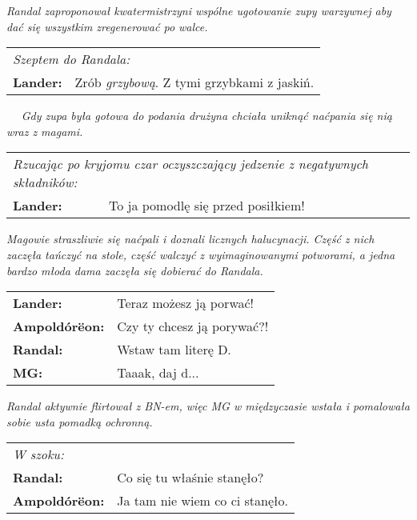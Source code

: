 \documentclass[10pt,twoside,twocolumn]{book}
\begin{document}
\begin{rpg-quotebox}{}
   \textit{Randal zaproponował kwatermistrzyni wspólne ugotowanie zupy warzywnej aby dać się wszystkim zregenerować po walce.}\\

   \begin{tabularx}{\columnwidth}{lX}
      \multicolumn{2}{l}{\textit{Szeptem do Randala:}}\\
      \textbf{Lander:} &  Zrób \emph{grzybową}. Z tymi grzybkami z jaskiń.\\
   \end{tabularx}
   ~\newline~
   \textit{Gdy zupa była gotowa do podania drużyna chciała uniknąć naćpania się nią wraz z magami.}\\

   \begin{tabularx}{\columnwidth}{lX}
      \multicolumn{2}{X}{\textit{Rzucając po kryjomu czar oczyszczający jedzenie z negatywnych składników:}}\\
      \textbf{Lander:} &  To ja pomodlę się przed posiłkiem!\\
   \end{tabularx}
\end{rpg-quotebox}

\begin{rpg-quotebox}{}
   \textit{Magowie straszliwie się naćpali i doznali licznych halucynacji. Część z nich zaczęła tańczyć na stole, część walczyć z wyimaginowanymi potworami, a jedna bardzo młoda dama zaczęła się dobierać do Randala.}\\

   \begin{tabularx}{\columnwidth}{lX}
      \textbf{Lander:} &  Teraz możesz ją porwać!\\
      \textbf{Ampoldórëon:} &  Czy ty chcesz ją porywać?!\\
      \textbf{Randal:} &  Wstaw tam literę D.\\
      \textbf{MG:} &  Taaak, daj d...\\
   \end{tabularx}
\end{rpg-quotebox}

\begin{rpg-quotebox}{}
   \textit{Randal aktywnie flirtował z BN-em, więc MG w międzyczasie wstała i pomalowała sobie usta pomadką ochronną.}\\

   \begin{tabularx}{\columnwidth}{lX}
      \multicolumn{2}{l}{\textit{W szoku:}}\\
      \textbf{Randal:} &  Co się tu właśnie stanęło?\\
      \textbf{Ampoldórëon:} &  Ja tam nie wiem co ci stanęło.\\
   \end{tabularx}
\end{rpg-quotebox}
\end{document}
